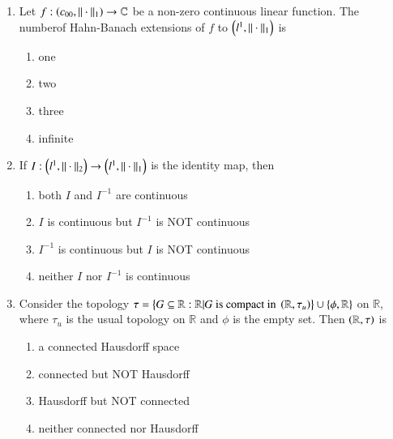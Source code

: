 \documentclass[journal,12pt,onecolumn]{IEEEtran}
\theoremstyle{remark}
\begin{document}
\begin{enumerate}
	\item Let $f : \left(c_{00}, ||\cdot||_{1}\right) \to \mathbb{C}$ be a non-zero continuous linear function. The numberof Hahn-Banach extensions of $f$ to $\left(l^{1}, || \cdot ||_{1}\right)$ is 
	\begin{multicols}{2}
	\begin{enumerate}
		\item one
		\item two
		\item three
		\item infinite
	\end{enumerate}
	\end{multicols}

	\item If $I : \left(l^{1}, || \cdot ||_{2}\right) \to \left(l^{1}, || \cdot ||_{1}\right)$ is the identity map, then
	\begin{enumerate}
		\item both $I$ and $I^{-1}$ are continuous
		\item $I$ is continuous but $I^{-1}$ is NOT continuous
		\item $I^{-1}$ is continuous but $I$ is NOT continuous
		\item neither $I$ nor $I^{-1}$ is continuous
	\end{enumerate}

\item Consider the topology $\tau = \left\{G \subseteq \mathbb{R} : \mathbb{R} | G \text{ is compact in } \left(\mathbb{R}, \tau _{u}\right)\right\} \cup \left\{\phi, \mathbb{R}\right\}$ on $\mathbb{R}$, where $\tau_{u}$ is the usual topology on $\mathbb{R}$ and $\phi$ is the empty set. Then $\left(\mathbb{R}, \tau\right)$ is
	\begin{enumerate}
		\item  a connected Hausdorff space
		\item connected but NOT Hausdorff
		\item Hausdorff but NOT connected
		\item neither connected nor Hausdorff
	\end{enumerate}


\end{enumerate}
\end{document}
